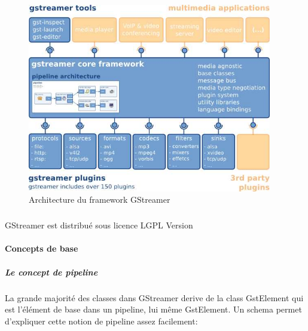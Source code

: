 \begin{figure} [H]

  \begin{center}

    \includegraphics[width=0.95\textwidth]{images/gstoverview}

  \end{center}

  \caption{Architecture du framework GStreamer}

  \label{Yes}

\end{figure}

\subparagraph{}

GStreamer est distribué sous licence LGPL Version

\paragraph{Concepts de base}

\subparagraph{Le concept de pipeline}

\subparagraph{}

La grande majorité des classes dans GStreamer derive de la class
GstElement qui est l'élément de base dans un pipeline, lui même
GstElement. Un schema permet d'expliquer cette notion de pipeline assez
facilement:

